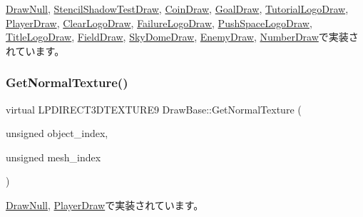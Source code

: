 \mbox{\hyperlink{class_draw_null_ad735978a85a5f3583eecd82d6bfe6413}{Draw\+Null}}, \mbox{\hyperlink{class_stencil_shadow_test_draw_acfa569f1dcdc3829796138e313f204ad}{Stencil\+Shadow\+Test\+Draw}}, \mbox{\hyperlink{class_coin_draw_a178c8d88effe55aaad7d0e45b02e0566}{Coin\+Draw}}, \mbox{\hyperlink{class_goal_draw_a7f30c7a4325668eebd8730ad2bea1ad8}{Goal\+Draw}}, \mbox{\hyperlink{class_tutorial_logo_draw_a19de254c5460e3728d7c79243fd65e6f}{Tutorial\+Logo\+Draw}}, \mbox{\hyperlink{class_player_draw_ad9e2e09a32c7474fcea5e7e24e22bc71}{Player\+Draw}}, \mbox{\hyperlink{class_clear_logo_draw_a99aba47b4693f15498daf7df2bfee2d7}{Clear\+Logo\+Draw}}, \mbox{\hyperlink{class_failure_logo_draw_aa7164b6f5788416788482893aa747d59}{Failure\+Logo\+Draw}}, \mbox{\hyperlink{class_push_space_logo_draw_a9a40fca53e23b9970a7c5decaa3d2da6}{Push\+Space\+Logo\+Draw}}, \mbox{\hyperlink{class_title_logo_draw_a14212f1ee003c40d63db3822a84af7fb}{Title\+Logo\+Draw}}, \mbox{\hyperlink{class_field_draw_aeb54d8cba559ef615ee46c8a7bbd3b9f}{Field\+Draw}}, \mbox{\hyperlink{class_sky_dome_draw_a7ecd8d4b987e4d58a247d3438a45f9d4}{Sky\+Dome\+Draw}}, \mbox{\hyperlink{class_enemy_draw_acda1a2487aea432b08fc816351a12239}{Enemy\+Draw}}, \mbox{\hyperlink{class_number_draw_a8234fb06d885feaa8a2f0ecf256db9a0}{Number\+Draw}}で実装されています。

\mbox{\label{class_draw_base_a87bb54e7f422959e84ac00aa7631bd3b}} 
\subsubsection{\texorpdfstring{Get\+Normal\+Texture()}{GetNormalTexture()}}
{\footnotesize\ttfamily virtual L\+P\+D\+I\+R\+E\+C\+T3\+D\+T\+E\+X\+T\+U\+R\+E9 Draw\+Base\+::\+Get\+Normal\+Texture (\begin{DoxyParamCaption}\item[{unsigned}]{object\+\_\+index,  }\item[{unsigned}]{mesh\+\_\+index }\end{DoxyParamCaption})\hspace{0.3cm}{\ttfamily [pure virtual]}}



\mbox{\hyperlink{class_draw_null_a41b7d148612b2d328e85289e32dc374c}{Draw\+Null}}, \mbox{\hyperlink{class_player_draw_abb93b530e38fc224ecbfe17d623f10fb}{Player\+Draw}}で実装されています。

